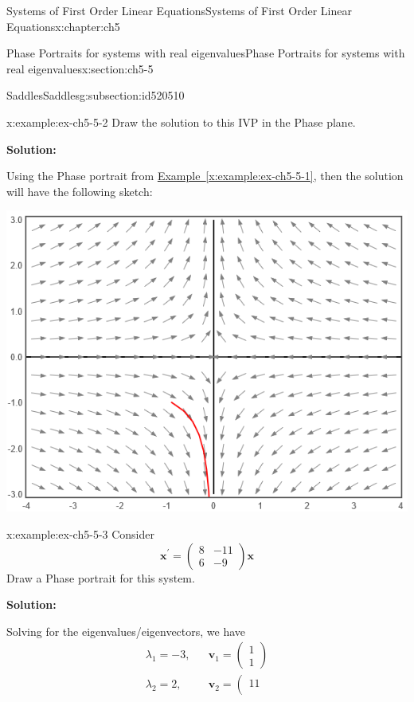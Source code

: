 \documentclass[oneside,10pt,]{book}
\newcommand{\xreffont}{\relax}
\newcommand{\terminology}[1]{\textbf{#1}}
\numberwithin{equation}{section}
\numberwithin{equation}{section}
\newcommand{\amp}{&}
\begin{document}
\begin{chapterptx}{Systems of First Order Linear Equations}{}{Systems of First Order Linear Equations}{}{}{x:chapter:ch5}
\begin{sectionptx}{Phase Portraits for systems with real eigenvalues}{}{Phase Portraits for systems with real eigenvalues}{}{}{x:section:ch5-5}
\begin{subsectionptx}{Saddles}{}{Saddles}{}{}{g:subsection:id520510}
\begin{example}{}{x:example:ex-ch5-5-2}
Draw the solution to this IVP in the Phase plane.%
\par
\terminology{Solution:}%
\par
Using the Phase portrait from \hyperref[x:example:ex-ch5-5-1]{Example~{\xreffont\ref{x:example:ex-ch5-5-1}}}, then the solution will have the following sketch: \begin{image}{0}{1}{0}%
\includegraphics[width=\linewidth]{images/Ex5-5-1b.png}
\end{image}%
%
\end{example}
\begin{example}{}{x:example:ex-ch5-5-3}%
Consider%
\begin{equation*}
\mathbf{x}^{\prime}=\left(\begin{array}{cc}
8 \amp -11\\
6 \amp -9
\end{array}\right)\mathbf{x}
\end{equation*}
Draw a Phase portrait for this system.%
\par
\terminology{Solution:}%
\par
Solving for the eigenvalues\slash{}eigenvectors, we have%
\begin{equation*}
\begin{array}{ccc}
\lambda_{1}=-3, \amp  \amp \mathbf{v}_{1}=\left(\begin{array}{c}
1\\
1
\end{array}\right)\\
\lambda_{2}=2, \amp  \amp \mathbf{v}_{2}=\left(\begin{array}{c}
11\\

\end{array}
\end{array}
\end{equation*}
\end{example}
\end{subsectionptx}
\end{sectionptx}
\end{chapterptx}
\end{document}

